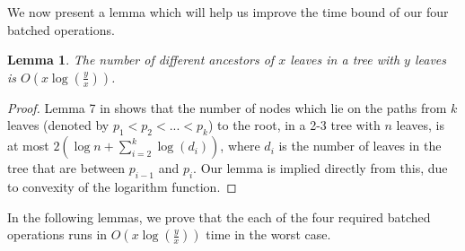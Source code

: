 \documentclass[11pt,a4paper]{article}
\newtheorem{lemma}{Lemma}
\theoremstyle{definition}
\theoremstyle{remark}
\begin{document}

We now present a lemma which will help us improve the time bound of our four batched operations.

\begin{lemma} \label{number of ancestors lemma}
The number of different ancestors of $x$ leaves in a tree with $y$ leaves is $O(x \log (\frac{y}{x}))$.
\end{lemma}
\begin{proof}
Lemma 7 in %
shows that the number of nodes which lie on the paths from $k$ leaves (denoted by $p_1<p_2<...<p_k$) to the root, in a 2-3 tree with $n$ leaves, is at most $2( \log n + \sum_{i=2}^{k} \log (d_i))$, where $d_i$ is the number of leaves in the tree that are between $p_{i-1}$ and $p_i$. Our lemma is implied directly from this, due to convexity of the logarithm function.
\end{proof}

In the following lemmas, we prove that the each of the four required batched operations runs in $O(x \log(\frac{y}{x}))$ time in the worst case.
\end{document}
